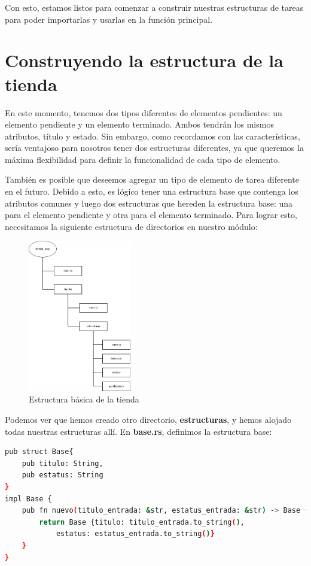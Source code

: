 Con esto, estamos listos para comenzar a construir nuestras estructuras de tareas para poder importarlas y usarlas en la función principal.

\section{Construyendo la estructura de la \textbf{tienda}}

En este momento, tenemos dos tipos diferentes de elementos pendientes: un elemento pendiente y un elemento terminado. Ambos tendrán los mismos atributos, título y estado. Sin embargo, como recordamos con las características, sería ventajoso para nosotros tener dos estructuras diferentes, ya que queremos la máxima flexibilidad para definir la funcionalidad de cada tipo de elemento.

También es posible que deseemos agregar un tipo de elemento de tarea diferente en el futuro. Debido a esto, es lógico tener una estructura base que contenga los atributos comunes y luego dos estructuras que hereden la estructura base: una para el elemento pendiente y otra para el elemento terminado. Para lograr esto, necesitamos la siguiente estructura de directorios en nuestro módulo:

\begin{figure}[htb]
	\centering
	\includegraphics[width=0.4\textwidth]{capitulo1/estructura_tienda.png}
	\caption{Estructura básica de la tienda}
	\label{cap1:002}
\end{figure} 

Podemos ver que hemos creado otro directorio, \textbf{estructuras}, y hemos alojado todas nuestras estructuras allí. En \textbf{base.rs}, definimos la estructura base:

\begin{lstlisting}[language=bash]
pub struct Base{
	pub titulo: String,
	pub estatus: String
}
impl Base {
	pub fn nuevo(titulo_entrada: &str, estatus_entrada: &str) -> Base {
		return Base {titulo: titulo_entrada.to_string(),
			estatus: estatus_entrada.to_string()}
	}
}
\end{lstlisting}

